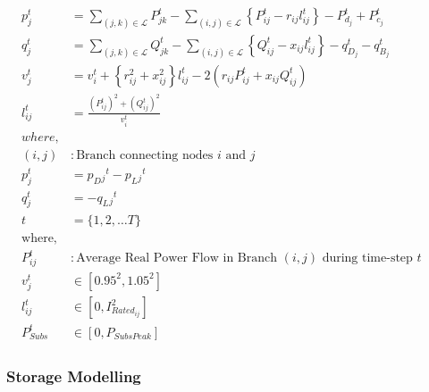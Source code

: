 \begin{gather}
	\begin{align}
		{p_j^t} & = {\sum_{(j, k) \in \mathcal{L}} P_{jk}^t - \sum_{(i, j) \in \mathcal{L}}\left\{P_{ij}^t - r_{ij}l_{ij}^t\right\} - P_{d_j}^t + P_{c_j}^t} && \\
		{q_j^t} & = {\sum_{(j, k) \in \mathcal{L}} Q_{jk}^t - \sum_{(i, j) \in \mathcal{L}}\left\{Q_{ij}^t - x_{ij}l_{ij}^t\right\} - q_{D_j}^t - q_{B_j}^t} && \\
		{v_j^t} & = {v_{i}^t +  \left\{r_{ij}^2 + x_{ij}^2\right\}l_{ij}^t - 2(r_{ij}P_{ij}^t + x_{ij}Q_{ij}^t)} && \\
		{l_{ij}^t} & = {\frac{(P_{ij}^{t})^2 + (Q_{ij}^{t})^2}{v_i^t}} \\
		{where,} & {} \\
		{(i, j)} &: {\text{Branch connecting nodes $i$ and $j$}} \\
		{p_j^t} &= {p_D{_j}^t - p_L{_j}^t} \\
		{q_j^t} &= {-q_L{_j}^t} \\
		{t} &= {\{1, 2, \ldots T\}} \\
		{\text{where,}} & {} \nonumber\\
		{P^t_{ij}} &: { \text{Average Real Power Flow in Branch $(i, j)$ during time-step $t$} }\nonumber\\
		{ v^t_{j} } &\in {[0.95^2, 1.05^2]} \\
		{ l^t_{ij} } &\in {[0, I_{Rated_{ij}}^2]} \\
		{P^t_{Subs}} &\in {[0, P_{SubsPeak}]}
	\end{align}
\end{gather}

\subsubsection*{Storage Modelling}

